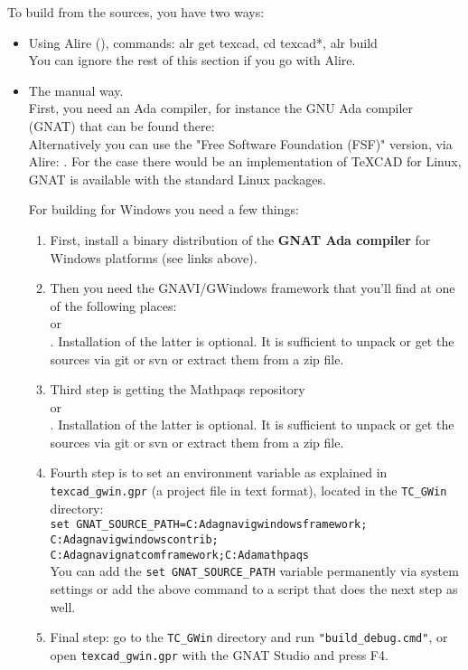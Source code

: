 \documentclass[11pt,a4paper]{article}
\begin{document}
To build {\TC} from the sources, you have two ways:
  \begin{itemize}
    \item Using Alire (), commands: alr get texcad, cd texcad*, alr build \\
          You can ignore the rest of this section if you go with Alire.
    \item The manual way. \\
First, you need an Ada compiler, for instance the
GNU Ada compiler (GNAT) that can be found there:
   \\
Alternatively you can use the "Free Software Foundation (FSF)" version, via Alire: .
For the case there would be an implementation of TeXCAD for Linux, GNAT is available with
the standard Linux packages.
  
For building {\TC} for Windows you need a few things:

\begin{enumerate}
  \item First, install 
        a binary distribution of the {\bf GNAT Ada compiler} for Windows platforms
        (see links above).
  \item Then you need the GNAVI/GWindows framework that you'll find at one of the following places:\\
         or\\
        .
        Installation of the latter is optional.
        It is sufficient to unpack or get the sources via git or svn or
        extract them from a zip file.
  \item Third step is getting the Mathpaqs repository\\
         or \\
        .
        Installation of the latter is optional.
        It is sufficient to unpack or get the sources via git or svn or
        extract them from a zip file.
  \item Fourth step is to set an environment variable as explained in {\tt texcad\_gwin.gpr}
        (a project file in text format), located in the {\tt TC\_GWin} directory:\\
        {\tt set GNAT\_SOURCE\_PATH=C:\bs Ada\bs gnavi\bs gwindows\bs framework;\\
         C:\bs Ada\bs gnavi\bs gwindows\bs contrib;\\
         C:\bs Ada\bs gnavi\bs gnatcom\bs framework;C:\bs Ada\bs mathpaqs} \\
        You can add the {\tt set GNAT\_SOURCE\_PATH} variable permanently via system settings or add the above command to a script that does the next step as well.
  \item Final step: go to the {\tt TC\_GWin} directory and run {\tt "build\_debug.cmd"},
        or open {\tt texcad\_gwin.gpr} with the GNAT Studio and press F4.
\end{enumerate}

  \end{itemize}
%
\end{document}
